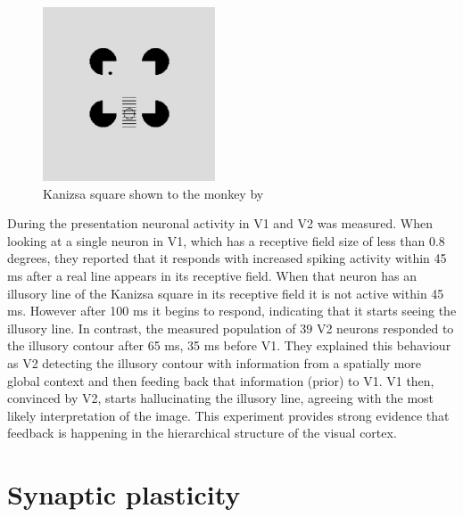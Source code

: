 \begin{figure}
  \includegraphics[width=\linewidth]{figures/kanizsaSquare.PNG}
  \caption{Kanizsa square shown to the monkey by \citet{HierachicalBayesVisualCortex}}
  \label{fig:KanizsaSquare}
\end{figure}
During the presentation neuronal activity in V1 and V2 was measured. When looking at a single neuron in V1, which has a receptive field size of less than 0.8 degrees, they reported that it responds with increased spiking activity within 45 ms after a real line appears in its receptive field. When that neuron has an illusory line of the Kanizsa square in its receptive field it is not active within 45 ms. However after 100 ms it begins to respond, indicating that it starts seeing the illusory line. In contrast, the measured population of 39 V2 neurons responded to the illusory contour after 65 ms, 35 ms before V1. They explained this behaviour as V2 detecting the illusory contour with information from a spatially more global context and then feeding back that information (prior) to V1. V1 then, convinced by V2, starts hallucinating the illusory line, agreeing with the most likely interpretation of the image. This experiment provides strong evidence that feedback is happening in the hierarchical structure of the visual cortex.

\section{Synaptic plasticity}

